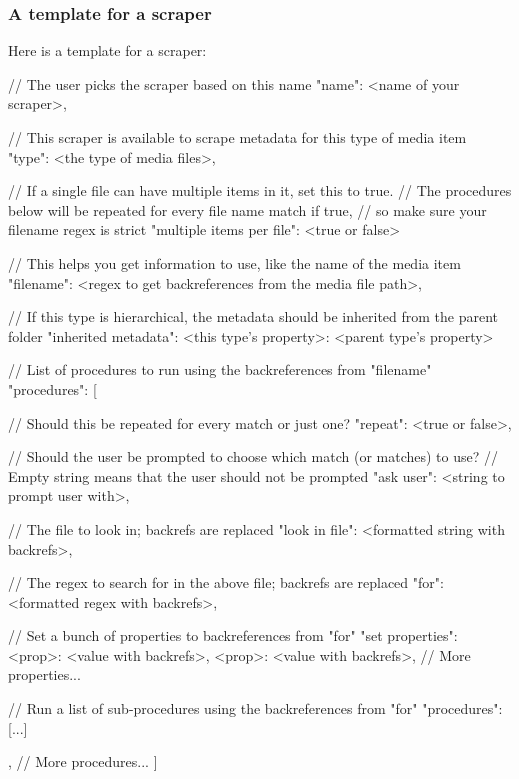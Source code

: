 \subsubsection*{A template for a scraper}

Here is a template for a scraper\-: \begin{DoxyVerb}{
    // The user picks the scraper based on this name
    "name": <name of your scraper>,

    // This scraper is available to scrape metadata for this type of media item
    "type": <the type of media files>,

    // If a single file can have multiple items in it, set this to true.
    // The procedures below will be repeated for every file name match if true,
    // so make sure your filename regex is strict
    "multiple items per file": <true or false>

    // This helps you get information to use, like the name of the media item
    "filename": <regex to get backreferences from the media file path>,

    // If this type is hierarchical, the metadata should be inherited from the parent folder
    "inherited metadata": {
        <this type's property>: <parent type's property>
    }

    // List of procedures to run using the backreferences from "filename"
    "procedures": [
        {
            // Should this be repeated for every match or just one?
            "repeat": <true or false>,

            // Should the user be prompted to choose which match (or matches) to use?
            // Empty string means that the user should not be prompted
            "ask user": <string to prompt user with>,

            // The file to look in; backrefs are replaced
            "look in file": <formatted string with backrefs>,

            // The regex to search for in the above file; backrefs are replaced
            "for": <formatted regex with backrefs>,

            // Set a bunch of properties to backreferences from "for"
            "set properties": {
                <prop>: <value with backrefs>,
                <prop>: <value with backrefs>,
                // More properties...
            }

            // Run a list of sub-procedures using the backreferences from "for"
            "procedures": [...]
        },
        // More procedures...
    ]

}
\end{DoxyVerb}
